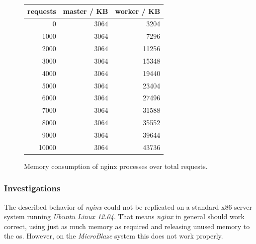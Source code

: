 \begin{figure}[H]
\begin{minipage}{0.4\textwidth}
\begin{tabular}{|r|r|r|}
    \hline
     \textbf{requests} & \textbf{master / KB} & \textbf{worker / KB} \\
    \hline
    0     & 3064  & 3204 \\
    1000  & 3064  & 7296 \\
    2000  & 3064  & 11256 \\
    3000  & 3064  & 15348 \\
    4000  & 3064  & 19440 \\
    5000  & 3064  & 23404 \\
    6000  & 3064  & 27496 \\
    7000  & 3064  & 31588 \\
    8000  & 3064  & 35552 \\
    9000  & 3064  & 39644 \\
    10000 & 3064  & 43736 \\
    \hline
    \end{tabular}
\end{minipage}
\begin{minipage}{0.60\textwidth}
	\centering
\end{minipage}
  \caption{Memory consumption of nginx processes over total requests.}
  \label{fig:nginx-mem}
\end{figure}

\subsubsection{Investigations}

The described behavior of \textit{nginx} could not be replicated on a standard x86 server system running \textit{Ubuntu Linux 12.04}. That means \textit{nginx} in general should work correct, using just as much memory as required and releasing unused memory to the \gls{os}. However, on the \textit{MicroBlaze} system this does not work properly.

